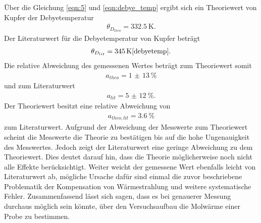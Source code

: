 Über die Gleichung \eqref{eqn:5} und \eqref{eqn:debye_temp}
ergibt sich ein Theoriewert von Kupfer der Debyetemperatur
\begin{align}
\theta_{D_{theo}} = \SI{332.5}{\kelvin}.
\end{align}
Der Literaturwert für die Debyetemperatur von
Kupfer beträgt
\begin{align}
\theta_{D_{lit}} = \SI{345}{\kelvin} \text{\cite{debyetemp}.}
\end{align}
Die relative Abweichung des gemessenen Wertes beträgt zum Theoriewert somit
\begin{align}
a_{theo} = \SI{1(13)}{\percent}
\end{align}
und zum Literaturwert
\begin{align}
a_{lit}= \SI{5(12)}{\percent}.
\end{align}
Der Theoriewert besitzt eine relative Abweichung von
\begin{align}
a_{theo,lit}=\SI{3.6}{\percent}
\end{align}
zum Literaturwert.
Aufgrund der Abweichung der Messwerte zum Theoriewert
scheint die Messwerte die Theorie zu bestätigen bis auf die
hohe Ungenauigkeit des Messwertes. Jedoch zeigt
der Literaturwert eine geringe Abweichung zu dem Theoriewert.
Dies deutet darauf hin, dass die Theorie möglicherweise noch nicht alle
Effekte berücksichtigt. Weiter weicht der gemessene Wert ebenfalls leicht von Literaturwert ab,
mögliche Ursache dafür sind einmal die zuvor beschriebene Problematik der Kompensation von Wärmestrahlung
und weitere systematische Fehler.
Zusammenfassend lässt sich sagen, dass es bei genauerer Messung
durchaus möglich sein könnte, über den Versuchsaufbau
die Molwärme einer Probe zu bestimmen.
